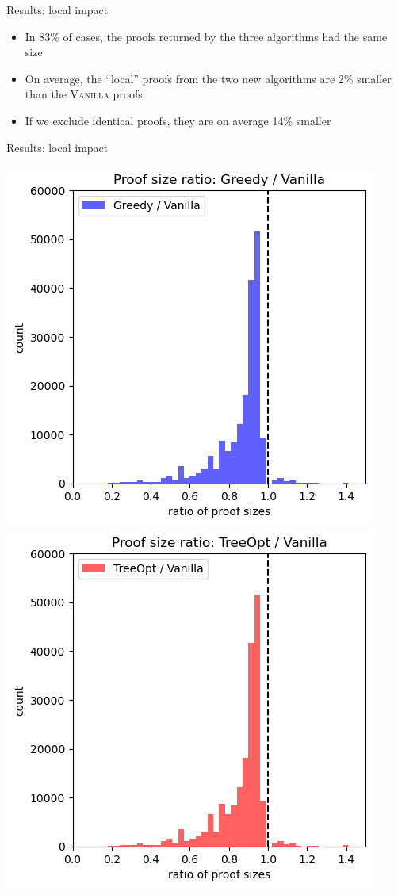 \documentclass[aspectratio=169]{beamer}
\newcommand\vitem{\vfill\item}
\newcommand\pvitem{\pause\vfill\item}
\begin{document}
\begin{frame}{Results: local impact}
  \begin{itemize}
    \item In 83\% of cases, the proofs returned by the three algorithms had the
    same size
    \vitem On average, the ``local'' proofs from the two new algorithms are 2\%
    smaller than the \textsc{Vanilla} proofs
    \pvitem If we exclude identical proofs, they are on average 14\% smaller
  \end{itemize}
\end{frame}

\begin{frame}{Results: local impact}
  \centerline{
  \includegraphics[width=0.45 \textwidth]{images/proof-ratio-hist-greedy.png}
  \includegraphics[width=0.45 \textwidth]{images/proof-ratio-hist-treeopt.png}
  }
\end{frame}
\end{document}
